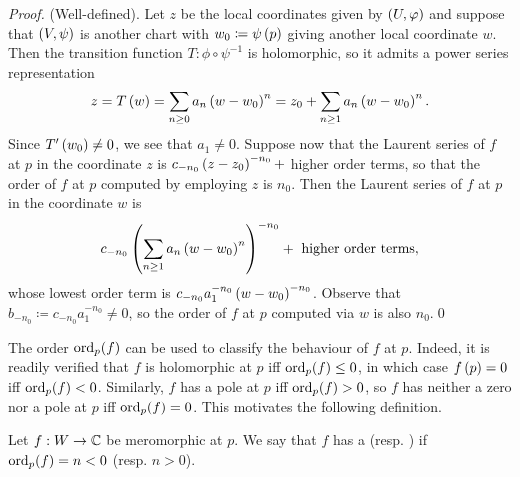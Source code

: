 \documentclass[../Moduli_Spaces_of_Riemann_Surfaces.tex]{subfiles}
\begin{document}
    \begin{proof}
        (Well-defined). Let $z$ be the local coordinates given by $\left(U,\varphi\right)$ and suppose that $\left(V,\psi\right)$ is another chart with $w_0\coloneqq\psi\left(p\right)$ giving another local coordinate $w$. Then the transition function $T:\phi\circ\psi^{-1}$ is holomorphic, so it admits a power series representation
        \begin{equation*}
            z=T\left(w\right)=\sum_{n\geq0}a_n\left(w-w_0\right)^n=z_0+\sum_{n\geq1}a_n\left(w-w_0\right)^n.
        \end{equation*}
        Since $T'\left(w_0\right)\neq0$, we see that $a_1\neq0$. Suppose now that the Laurent series of $f$ at $p$ in the coordinate $z$ is $c_{-n_0}\left(z-z_0\right)^{-n_0}+$ higher order terms, so that the order of $f$ at $p$ computed by employing $z$ is $n_0$. Then the Laurent series of $f$ at $p$ in the coordinate $w$ is
        \begin{equation*}
            c_{-n_0}\left(\sum_{n\geq1}a_n\left(w-w_0\right)^n\right)^{-n_0}+\textrm{ higher order terms},
        \end{equation*}
        whose lowest order term is $c_{-n_0}a_1^{-n_0}\left(w-w_0\right)^{-n_0}$. Observe that $b_{-n_0}\coloneqq c_{-n_0}a_1^{-n_0}\neq0$, so the order of $f$ at $p$ computed via $w$ is also $n_0$.\qed
    \end{proof}
    \begin{remark}
        The order $\operatorname{ord}_p\!\left(f\right)$ can be used to classify the behaviour of $f$ at $p$. Indeed, it is readily verified that $f$ is holomorphic at $p$ iff $\operatorname{ord}_p\!\left(f\right)\leq0$, in which case $f\left(p\right)=0$ iff $\operatorname{ord}_p\!\left(f\right)<0$. Similarly, $f$ has a pole at $p$ iff $\operatorname{ord}_p\!\left(f\right)>0$, so $f$ has neither a zero nor a pole at $p$ iff $\operatorname{ord}_p\!\left(f\right)=0$. This motivates the following definition.\exqed
    \end{remark}
    \begin{definition}
        Let $f:W\to\mathbb{C}$ be meromorphic at $p$. We say that $f$ has a  (resp. )  if $\operatorname{ord}_p\!\left(f\right)=n<0$ (resp. $n>0$).
    \end{definition}
\end{document}
